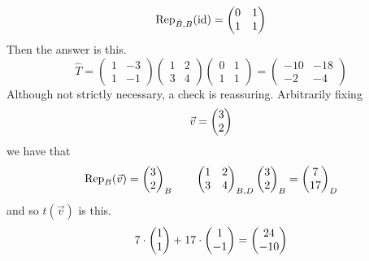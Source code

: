 \begin{exercises}
\begin{answer}
\begin{exparts}
\begin{equation*}
            \rep{\identity}{\hat{B},B}=\begin{pmatrix}
              0  &1  \\
              1  &1
            \end{pmatrix}
          \end{equation*}
          Then the answer is this.
          \begin{equation*}
            \hat{T}=
            \begin{pmatrix}
              1  &-3  \\
              1  &-1
            \end{pmatrix}
            \begin{pmatrix}
              1  &2  \\
              3  &4
            \end{pmatrix}
            \begin{pmatrix}
              0  &1  \\
              1  &1
            \end{pmatrix}
            =\begin{pmatrix}
              -10  &-18  \\
              -2   &-4 
            \end{pmatrix}
          \end{equation*}
          Although not strictly necessary, a check is reassuring.
          Arbitrarily fixing 
          \begin{equation*}
            \vec{v}=\colvec{3 \\ 2}
          \end{equation*}
          we have that
          \begin{equation*}
            \rep{\vec{v}}{B}=\colvec{3 \\ 2}_B
            \qquad
            \begin{pmatrix}
              1  &2  \\
              3  &4
            \end{pmatrix}_{B,D}
            \colvec{3 \\ 2}_B
            =\colvec{7 \\ 17}_D
          \end{equation*}
          and so $t(\vec{v})$ is this.
          \begin{equation*}
            7\cdot\colvec{1 \\ 1}+17\cdot\colvec{1 \\ -1}=\colvec{24 \\ -10}

\end{equation*}
\end{exparts}
\end{answer}
\end{exercises}
